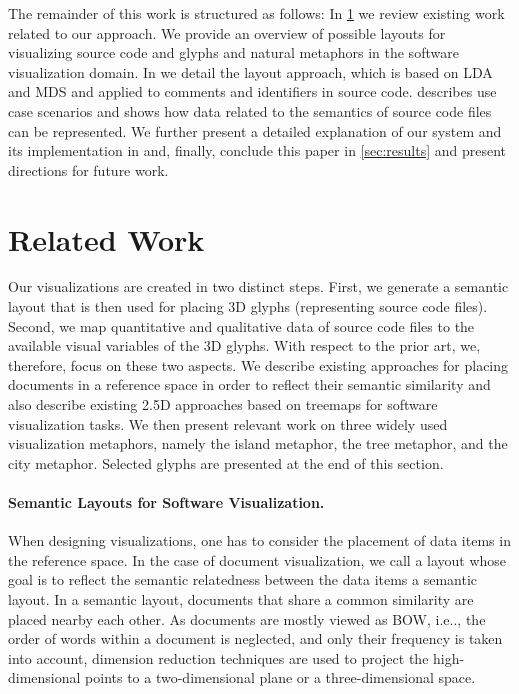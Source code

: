 \documentclass[runningheads]{llncs}
\makeatletter
\DeclareRobustCommand\onedot{\futurelet\@let@token\@onedot}
\def\@onedot{\ifx\@let@token.\else.\null\fi\xspace}
\def\ie{i.e\onedot,\xspace}
\makeatother
\begin{document}
The remainder of this work is structured as follows:
In \cref{sec:related} we review existing work related to our approach. We provide an overview of possible layouts for visualizing source code and glyphs and natural metaphors in the software visualization domain.
In  we detail the layout approach, which is based on \ac{LDA} and \ac{MDS} and applied to comments and identifiers in source code.
 describes use case scenarios and shows how data related to the semantics of source code files can be represented.
We further present a detailed explanation of our system and its implementation in  and, finally,
conclude this paper in \cref{sec:results} and present directions for future work.

\section{Related Work}
\label{sec:related}
Our visualizations are created in two distinct steps.
First, we generate a semantic layout that is then used for placing 3D glyphs (representing source code files).
Second, we map quantitative and qualitative data of source code files to the available visual variables of the 3D glyphs.
With respect to the prior art, we, therefore, focus on these two aspects.
We describe existing approaches for placing documents in a reference space in order to reflect their semantic similarity and also describe existing 2.5D approaches based on treemaps for software visualization tasks.
We then present relevant work on three widely used visualization metaphors, namely the island metaphor, the tree metaphor, and the city metaphor.
Selected glyphs are presented at the end of this section.

\paragraph{Semantic Layouts for Software Visualization.}
When designing visualizations, one has to consider the placement of data items in the reference space.
In the case of document visualization, we call a layout whose goal is to reflect the semantic relatedness between the data items a semantic layout.
In a semantic layout, documents that share a common similarity are placed nearby each other.
As documents are mostly viewed as \ac{BOW}, \ie the order of words within a document is neglected, and only their frequency is taken into account, dimension reduction techniques are used to project the high-dimensional points to a two-dimensional plane or a three-dimensional space.
\end{document}
